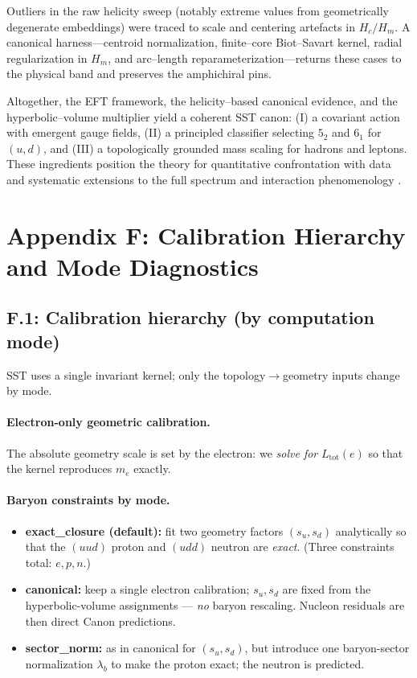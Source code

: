 \documentclass[smallextended]{svjour3}       %
\begin{document}
    Outliers in the raw helicity sweep (notably extreme values from geometrically degenerate embeddings) were traced to scale and centering artefacts in \(H_c/H_m\). A canonical harness—centroid normalization, finite–core Biot–Savart kernel, radial regularization in \(H_m\), and arc–length reparameterization—returns these cases to the physical band and preserves the amphichiral pins.

    Altogether, the EFT framework, the helicity–based canonical evidence, and the hyperbolic–volume multiplier yield a coherent SST canon: (I) a covariant action with emergent gauge fields, (II) a principled classifier selecting \(5_2\) and \(6_1\) for \((u,d)\), and (III) a topologically grounded mass scaling for hadrons and leptons. These ingredients position the theory for quantitative confrontation with data and systematic extensions to the full spectrum and interaction phenomenology \cite{Barcelo2011,Volovik2003,Faddeev1997,Arnold1998}.


\section*{Appendix F: Calibration Hierarchy and Mode Diagnostics}
\label{sec:calibration-hierarchy}
\subsection*{F.1: Calibration hierarchy (by computation mode)}
		SST uses a single invariant kernel; only the topology\(\to\)geometry inputs change by mode.

		\paragraph{Electron-only geometric calibration.}
		The absolute geometry scale is set by the electron: we \emph{solve for} \(L_{\text{tot}}(e)\) so that the kernel reproduces \(m_e\) exactly.

		\paragraph{Baryon constraints by mode.}
		\begin{itemize}
		\item \textbf{exact\_closure (default):} fit two geometry factors \((s_u,s_d)\) analytically so that the \((uud)\) proton and \((udd)\) neutron are \emph{exact}. (Three constraints total: \(e,p,n\).)
		\item \textbf{canonical:} keep a single electron calibration; \(s_u,s_d\) are fixed from the hyperbolic-volume assignments — \emph{no} baryon rescaling. Nucleon residuals are then direct Canon predictions.
		\item \textbf{sector\_norm:} as in canonical for \((s_u,s_d)\), but introduce one baryon-sector normalization \(\lambda_b\) to make the proton exact; the neutron is predicted.
		\end{itemize}
\end{document}
